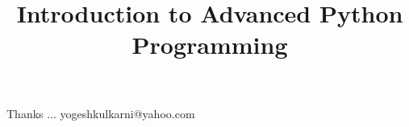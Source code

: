 \documentclass[xcolor=dvipsnames,compress,t,pdf]{beamer}
\title[\insertframenumber /\inserttotalframenumber]{Introduction to Advanced Python Programming}
\begin{document}
	\begin{frame}
	\titlepage
	\end{frame}

		
	
	\begin{frame}[c]{}
	Thanks ...
	\vspace{5mm}
	yogeshkulkarni@yahoo.com
	\end{frame}
\end{document}
